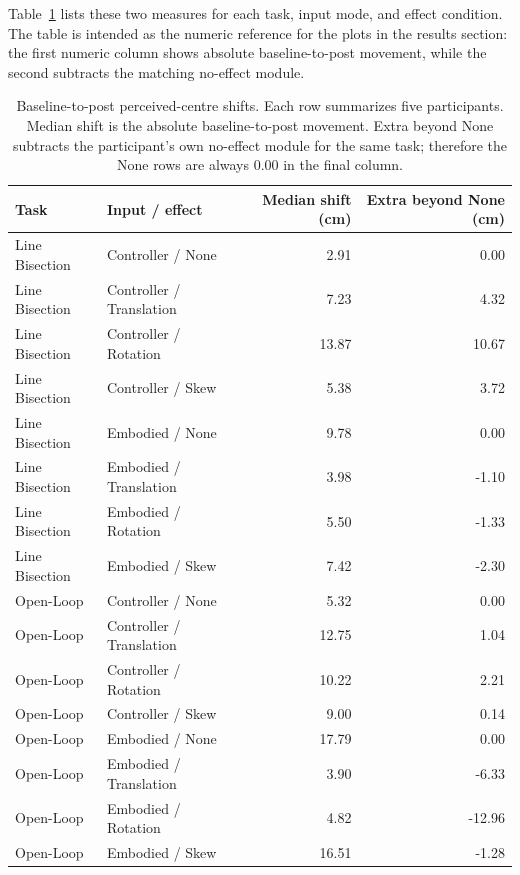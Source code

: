 Table~\ref{tab:article-results-summary} lists these two measures for each task, input mode, and effect condition. The table is intended as the numeric reference for the plots in the results section: the first numeric column shows absolute baseline-to-post movement, while the second subtracts the matching no-effect module.

\begin{table}[t]
    \centering
    \footnotesize
    \setlength{\tabcolsep}{4pt}
    \renewcommand{\arraystretch}{1.1}
    \begin{tabular}{llrr}
        \toprule
        \textbf{Task} & \textbf{Input / effect} & \textbf{Median shift (cm)} & \textbf{Extra beyond None (cm)} \\
        \midrule
        Line Bisection & Controller / None & 2.91 & 0.00 \\
        Line Bisection & Controller / Translation & 7.23 & 4.32 \\
        Line Bisection & Controller / Rotation & 13.87 & 10.67 \\
        Line Bisection & Controller / Skew & 5.38 & 3.72 \\
        Line Bisection & Embodied / None & 9.78 & 0.00 \\
        Line Bisection & Embodied / Translation & 3.98 & -1.10 \\
        Line Bisection & Embodied / Rotation & 5.50 & -1.33 \\
        Line Bisection & Embodied / Skew & 7.42 & -2.30 \\
        Open-Loop & Controller / None & 5.32 & 0.00 \\
        Open-Loop & Controller / Translation & 12.75 & 1.04 \\
        Open-Loop & Controller / Rotation & 10.22 & 2.21 \\
        Open-Loop & Controller / Skew & 9.00 & 0.14 \\
        Open-Loop & Embodied / None & 17.79 & 0.00 \\
        Open-Loop & Embodied / Translation & 3.90 & -6.33 \\
        Open-Loop & Embodied / Rotation & 4.82 & -12.96 \\
        Open-Loop & Embodied / Skew & 16.51 & -1.28 \\
        \bottomrule
    \end{tabular}
    \caption{Baseline-to-post perceived-centre shifts. Each row summarizes five participants. Median shift is the absolute baseline-to-post movement. Extra beyond None subtracts the participant's own no-effect module for the same task; therefore the None rows are always 0.00 in the final column.}
    \label{tab:article-results-summary}
\end{table}
